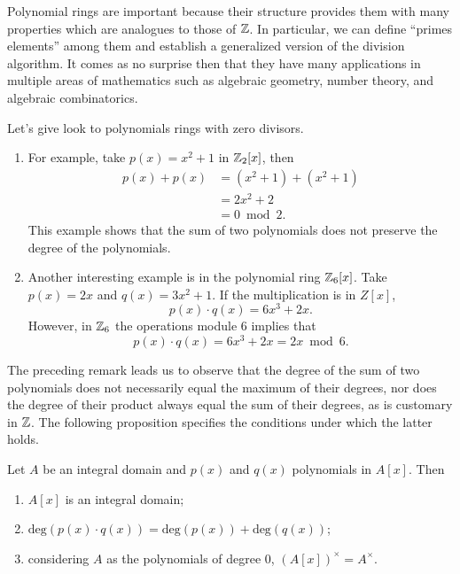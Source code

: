 \documentclass[11pt,a4paper]{article}
\begin{document}
	\begin{rem}
	Polynomial rings are important because their structure provides them with many properties which are analogues to those of $\mathbb{Z}$. In particular, we can define ``primes elements'' among them and establish a generalized version of the division algorithm. It comes as no surprise then that they have many applications in multiple areas of mathematics such as algebraic geometry, number theory, and algebraic combinatorics.
\end{rem}

\begin{exa}
 Let's give look to polynomials rings with zero divisors. 
 \begin{enumerate}[label=(\roman*)]
     \item For example, take $p(x)=x^2+1$ in $\mathbb{Z}_2[x]$, then
     \begin{align*}
     p(x)+p(x)&=(x^2+1)+(x^2+1)\\
     		  &=2x^2+2\\
     		  &=0 \bmod 2.
     \end{align*}
     This example shows that the sum of two polynomials does not preserve the degree of the polynomials.
     \item Another interesting example is in the polynomial ring $\mathbb{Z}_6[x]$. Take $p(x)=2x$ and $q(x)=3x^2+1$. If the multiplication is in $Z[x]$,  \[p(x)\cdot q(x)= 6x^3+2x.\] However, in  $\mathbb{Z}_6$ the operations module $6$ implies that
 \[p(x)\cdot q(x)= 6x^3+2x=2x  \bmod 6.\]
 \end{enumerate}
\end{exa}
The preceding remark leads us to observe that the degree of the sum of two polynomials does not necessarily equal the maximum of their degrees, nor does the degree of their product always equal the sum of their degrees, as is customary in \(\mathbb{Z}\). The following proposition specifies the conditions under which the latter holds.

\begin{prop}
\label{IDfractions}
Let $A$ be an integral domain and $p(x)$ and $q(x)$ polynomials in $A[x].$ Then
\begin{enumerate}[label=(\roman*)]
    \item $A[x]$ is an integral domain;
    \item $\text{deg}(p(x)\cdot q(x)) = \text{deg}(p(x))+ \text{deg}(q(x))$;
    \item considering $A$ as the polynomials of degree 0, $(A[x])^{\times}=A^{\times}.$
\end{enumerate}
\end{prop}
\end{document}
